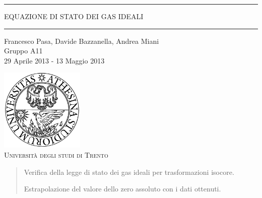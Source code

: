 \begin{titlepage}
\begin{center}

	\hrule \vspace{0.5cm}
     	\textsc{\LARGE EQUAZIONE DI STATO DEI GAS IDEALI}
	\vspace{0.5cm} \hrule \vspace{2cm}

      	{\large Francesco Pasa, Davide Bazzanella, Andrea Miani\\
		Gruppo A11}\\
	\vspace{0.5cm}
      	{\large 29 Aprile 2013 - 13 Maggio 2013}
	\vfill

	\includegraphics[width=4cm]{unitn_logo.png}\\
	\vspace{1cm}
        \textsc{\Large Università degli studi di Trento}
	\vfill

	{\begin{abstract}
Verifica della legge di stato dei gas ideali per trasformazioni isocore.

Estrapolazione del valore dello zero assoluto con i dati ottenuti.
	 \end{abstract}}
\end{center}
\end{titlepage}
